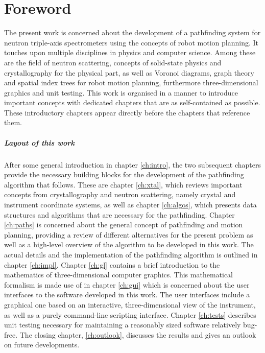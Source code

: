 %
%

\chapter*{Foreword}
The present work is concerned about the development of a pathfinding system for neutron triple-axis
spectrometers using the concepts of robot motion planning.
It touches upon multiple disciplines in physics and computer science. Among these are the field
of neutron scattering, concepts of solid-state physics and crystallography for the physical part,
as well as Voronoi diagrams, graph theory and spatial index trees for robot motion 
planning, furthermore three-dimensional graphics and unit testing.
This work is organised in a manner to introduce important concepts with dedicated chapters that are
as self-contained as possible. These introductory chapters appear directly before the chapters that reference
them.

\paragraph{Layout of this work}
After some general introduction in chapter \ref{ch:intro}, the two subsequent chapters 
provide the necessary building blocks for the development of the pathfinding algorithm that follows.
These are chapter \ref{ch:xtal}, which reviews important concepts from crystallography and
neutron scattering, namely crystal and instrument coordinate systems,
as well as chapter \ref{ch:algos}, which presents data structures and algorithms 
that are necessary for the pathfinding.
Chapter \ref{ch:paths} is concerned about the general concept of pathfinding and motion planning, providing
a review of different alternatives for the present problem as well as a high-level overview of the algorithm
to be developed in this work. The actual details and the implementation of the pathfinding algorithm
is outlined in chapter \ref{ch:impl}.
Chapter \ref{ch:gl} contains a brief introduction to the mathematics of three-dimensional computer graphics.
This mathematical formalism is made use of in chapter \ref{ch:gui} which is concerned about the user interfaces to the software
developed in this work. The user interfaces include a graphical one based on an interactive, three-dimensional
view of the instrument, as well as a purely command-line scripting interface.
Chapter \ref{ch:tests} describes unit testing necessary for maintaining
a reasonably sized software relatively bug-free.
The closing chapter, \ref{ch:outlook}, discusses the results and gives an outlook 
on future developments.

